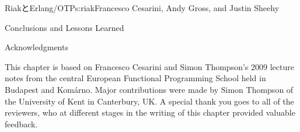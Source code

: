 \begin{aosachapter}{RiakとErlang/OTP}{s:riak}{Francesco Cesarini, Andy Gross, and Justin Sheehy}
\begin{aosasect1}{Conclusions and Lessons Learned}
\begin{aosasect2}{Acknowledgments}

This chapter is based on Francesco Cesarini and Simon Thompson's 2009
lecture notes from the central European Functional Programming School
held in Budapest and Kom\'{a}rno. Major contributions were made by
Simon Thompson of the University of Kent in Canterbury, UK. A special
thank you goes to all of the reviewers, who at different stages in the
writing of this chapter provided valuable feedback.

\end{aosasect2}

\end{aosasect1}

\end{aosachapter}

